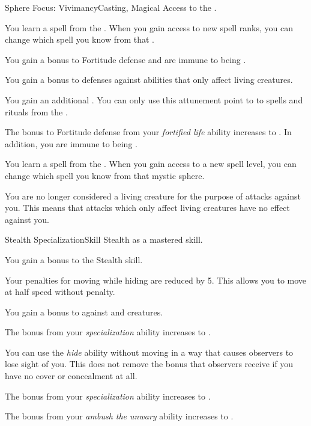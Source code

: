     \begin{feat}{Sphere Focus: Vivimancy}{Casting, Magical}
        \featpre Access to the  .

         You learn a spell from the  .
        When you gain access to new spell ranks, you can change which spell you know from that .

         You gain a  bonus to Fortitude defense and are immune to being .

         You gain a  bonus to defenses against abilities that only affect living creatures.

         You gain an additional .
        You can only use this attunement point to  to spells and rituals from the  .

         The bonus to Fortitude defense from your \textit{fortified life} ability increases to .
        In addition, you are immune to being .

         You learn a spell from the  .
        When you gain access to a new spell level, you can change which spell you know from that mystic sphere.

         You are no longer considered a living creature for the purpose of attacks against you.
        This means that attacks which only affect living creatures have no effect against you.
    \end{feat}

    \begin{feat}{Stealth Specialization}{Skill}
        \featpre Stealth as a mastered skill.

         You gain a  bonus to the Stealth skill.

         Your penalties for moving while hiding are reduced by 5.
        This allows you to move at half speed without penalty.

         You gain a  bonus to  against  and  creatures.

         The bonus from your \textit{specialization} ability increases to .

         You can use the \textit{hide} ability without moving in a way that causes observers to lose sight of you.
        This does not remove the bonus that observers receive if you have no cover or concealment at all.

         The bonus from your \textit{specialization} ability increases to .

         The bonus from your \textit{ambush the unwary} ability increases to .
    \end{feat}


